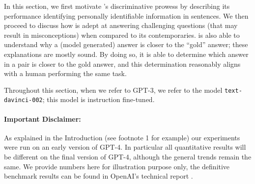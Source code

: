 In this section, we first motivate \DV's discriminative prowess by describing its performance identifying personally identifiable information in sentences. We then proceed to discuss how {\DV} is adept at answering challenging questions (that may result in misconceptions) when compared to its contemporaries. {\DV} is also able to understand why a (model generated) answer is closer to the ``gold'' answer; these explanations are mostly sound. By doing so, it is able to determine which answer in a pair is closer to the gold answer, and this determination reasonably aligns with a human performing the same task. 

Throughout this section, when we refer to GPT-3, we refer to the model \texttt{text-davinci-002}; this model is instruction fine-tuned.


\paragraph{Important Disclaimer:} As explained in the Introduction (see footnote 1 for example) our experiments were run on an early version of GPT-4. In particular all quantitative results will be different on the final version of GPT-4, although the general trends remain the same. We provide numbers here for illustration purpose only, the definitive benchmark results can be found in OpenAI's technical report \cite{gpt4}.



% 
%
